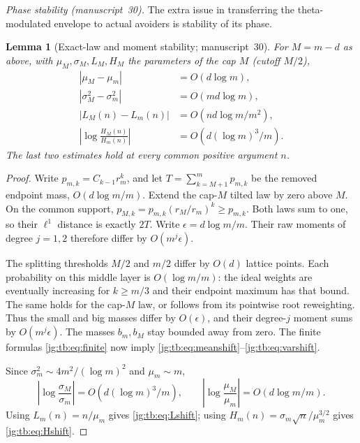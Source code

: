 \documentclass[11pt,a4paper]{article}
\newtheorem{lemma}[lemma]{Lemma}
\theoremstyle{definition}\newaliascnt{definition}{theorem}
\theoremstyle{remark}\newaliascnt{remark}{theorem}
\begin{document}
\emph{Phase stability (manuscript~30).} The extra issue in transferring the
theta-modulated envelope to actual avoiders is stability of its phase.

\begin{lemma}[Exact-law and moment stability; manuscript~30]
\label{jg:tb:lem:stability}
For $M=m-d$ as above, with $\mu_M,\sigma_M,L_M,H_M$ the parameters of the cap
$M$ (cutoff $M/2$),
\begin{align}
 |\mu_M-\mu_m|&=O(d\log m),\label{jg:tb:eq:meanshift}\\
 |\sigma_M^2-\sigma_m^2|&=O(md\log m),\label{jg:tb:eq:varshift}\\
 |L_M(n)-L_m(n)|&=O(nd\log m/m^2),\label{jg:tb:eq:Lshift}\\
 \left|\log\frac{H_M(n)}{H_m(n)}\right|
       &=O(d(\log m)^3/m).\label{jg:tb:eq:Hshift}
\end{align}
The last two estimates hold at every common positive argument $n$.
\end{lemma}
\begin{proof}
Write $p_{m,k}=C_{k-1}r_m^k$, and let $T=\sum_{k=M+1}^mp_{m,k}$ be the removed
endpoint mass, $O(d\log m/m)$. Extend the cap-$M$ tilted law by zero above $M$.
On the common support, $p_{M,k}=p_{m,k}(r_M/r_m)^k\ge p_{m,k}$. Both laws sum
to one, so their $\ell^1$ distance is exactly $2T$. Write
$\epsilon=d\log m/m$. Their raw moments of degree $j=1,2$ therefore differ by
$O(m^j\epsilon)$.

The splitting thresholds $M/2$ and $m/2$ differ by $O(d)$ lattice points. Each
probability on this middle layer is $O(\log m/m)$: the ideal weights are
eventually increasing for $k\ge m/3$ and their endpoint maximum has that bound.
The same holds for the cap-$M$ law, or follows from its pointwise root
reweighting. Thus the small and big masses differ by $O(\epsilon)$, and their
degree-$j$ moment sums by $O(m^j\epsilon)$. The masses $b_m,b_M$ stay bounded
away from zero. The finite formulas \eqref{jg:tb:eq:finite} now imply
\eqref{jg:tb:eq:meanshift}--\eqref{jg:tb:eq:varshift}.

Since $\sigma_m^2\sim4m^2/(\log m)^2$ and $\mu_m\sim m$,
\[
 \left|\log\frac{\sigma_M}{\sigma_m}\right|
      =O(d(\log m)^3/m),\qquad
 \left|\log\frac{\mu_M}{\mu_m}\right|
      =O(d\log m/m).
\]
Using $L_m(n)=n/\mu_m$ gives \eqref{jg:tb:eq:Lshift}; using
$H_m(n)=\sigma_m\sqrt n/\mu_m^{3/2}$ gives \eqref{jg:tb:eq:Hshift}.
\end{proof}
\end{document}
